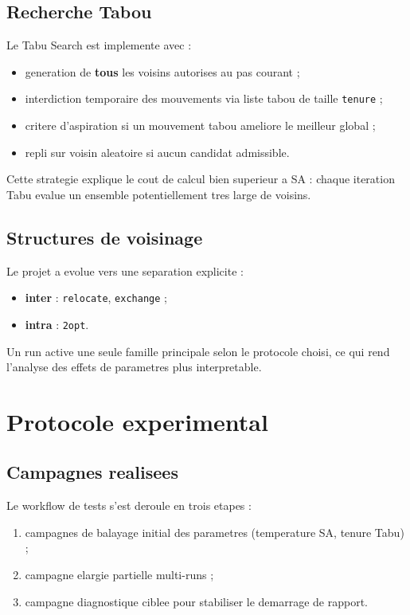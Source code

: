 \documentclass[12pt,a4paper]{report}
\begin{document}
\section{Recherche Tabou}
Le Tabu Search est implemente avec :
\begin{itemize}[leftmargin=1.2cm]
  \item generation de \textbf{tous} les voisins autorises au pas courant ;
  \item interdiction temporaire des mouvements via liste tabou de taille \texttt{tenure} ;
  \item critere d'aspiration si un mouvement tabou ameliore le meilleur global ;
  \item repli sur voisin aleatoire si aucun candidat admissible.
\end{itemize}

Cette strategie explique le cout de calcul bien superieur a SA :
chaque iteration Tabu evalue un ensemble potentiellement tres large de voisins.

\section{Structures de voisinage}
Le projet a evolue vers une separation explicite :
\begin{itemize}[leftmargin=1.2cm]
  \item \textbf{inter} : \texttt{relocate}, \texttt{exchange} ;
  \item \textbf{intra} : \texttt{2opt}.
\end{itemize}

Un run active une seule famille principale selon le protocole choisi,
ce qui rend l'analyse des effets de parametres plus interpretable.

\chapter{Protocole experimental}

\section{Campagnes realisees}
Le workflow de tests s'est deroule en trois etapes :
\begin{enumerate}
  \item campagnes de balayage initial des parametres (temperature SA, tenure Tabu) ;
  \item campagne elargie partielle multi-runs ;
  \item campagne diagnostique ciblee pour stabiliser le demarrage de rapport.
\end{enumerate}
\end{document}
